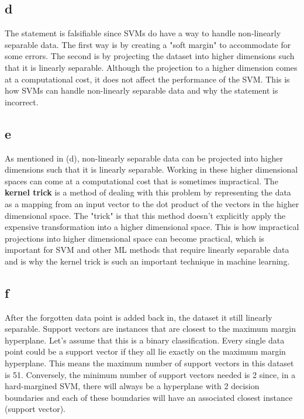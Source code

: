 \documentclass{article}
\begin{document}
\subsection*{d}

The statement is falsifiable since SVMs do have a way to handle non-linearly separable data.
The first way is by creating a "soft margin" to accommodate for some errors. The second is by projecting
the dataset into higher dimensions such that it is linearly separable. Although the projection to 
a higher dimension comes at a computational cost, it does not affect the performance of the 
SVM. This is how SVMs can handle non-linearly separable data and why the statement 
is incorrect.

\subsection*{e}

As mentioned in (d), non-linearly separable data can be projected into higher dimensions such that it is 
linearly separable. Working in these higher dimensional spaces can come at a 
computational cost that is sometimes impractical. The \textbf{kernel trick} is a method of dealing
with this problem by representing the data as a mapping from an input vector 
to the dot product of the vectors in the higher dimensional space. The "trick" is that this method doesn't explicitly apply the 
expensive transformation into a higher dimensional space. This is how impractical projections into higher
dimensional space can become practical, which is important for SVM and other ML methods that 
require linearly separable data and is why the kernel trick is such an important technique in machine learning.

\subsection*{f}

After the forgotten data point is added back in, the dataset it still 
linearly separable. Support vectors are instances that are closest to the
maximum margin hyperplane. Let's assume that this is a binary classification. 
Every single data point could be a support vector if they all lie exactly on the 
maximum margin hyperplane. This means the maximum number of support vectors in this 
dataset is 51. Conversely, the minimum number of support vectors needed 
is 2 since, in a hard-margined SVM, there will always be a hyperplane with 2 
decision boundaries and each of these boundaries will have an associated closest
instance (support vector).
\end{document}
